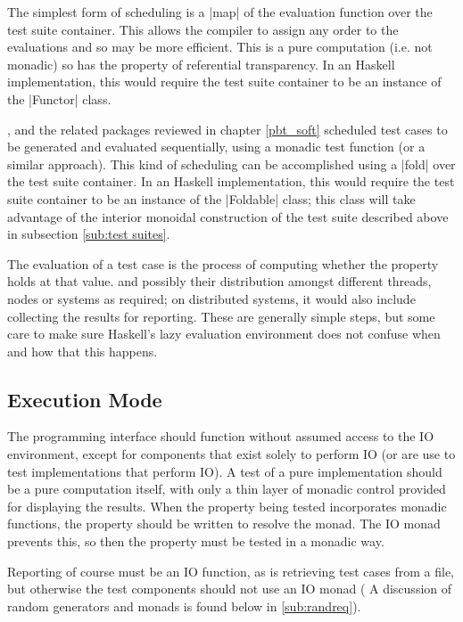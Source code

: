 The simplest form of scheduling is 
a |map| of the evaluation function
over the test suite container.
This allows the compiler to assign any order
to the evaluations and so may be more efficient.
This is a pure computation (i.e. not monadic) 
so has the property of referential transparency.
In an Haskell implementation,
this would require the test suite container to be an instance of the |Functor| class.

\QC, \SC and the related packages reviewed in chapter \ref{pbt_soft}
scheduled test cases to be generated and evaluated sequentially,
using a monadic test function (or a similar approach).
This kind of scheduling can be accomplished using 
a |fold| over the test suite container.
In an Haskell implementation,
this would require the test suite container to be an instance of the |Foldable| class;
this class will take advantage of the interior monoidal construction of the test suite
described above in subsection \ref{sub:test suites}.

The evaluation of a test case is the process of computing 
whether the property holds at that value.
and possibly their distribution amongst different threads, nodes or systems as required;
on distributed systems, it would also include collecting the results for reporting.
These are generally simple steps,
but some care to make sure
Haskell's lazy evaluation environment does not confuse 
when and how that this happens.

\subsection{Execution Mode}

The programming interface should function without assumed access to the IO environment,
except for components that exist solely to perform IO
(or are use to test implementations that perform IO).
A test of a pure implementation should be a pure computation itself,
with only a thin layer of monadic control provided for displaying the results.
When the property being tested incorporates monadic functions,
the property should be written to resolve the monad.
The IO monad prevents this, so then the property must be tested in a monadic way.


Reporting of course must be an IO function,
as is retrieving test cases from a file,
but otherwise the test components should not use an IO monad
( A discussion of random generators and monads
is found below in \ref{sub:randreq}).

